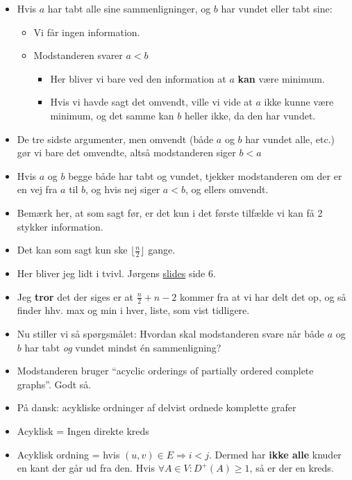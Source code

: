 \begin{frame}[allowframebreaks]
\begin{itemize}
		\item Hvis $a$ har tabt alle sine sammenligninger, og $b$ har vundet eller tabt sine:
		      \begin{itemize}
			      \item Vi får ingen information.
			      \item Modstanderen svarer $a < b$
			            \begin{itemize}
				            \item Her bliver vi bare ved den information at $a$ \textbf{kan} være minimum.
				            \item Hvis vi havde sagt det omvendt, ville vi vide at $a$ ikke kunne være minimum, og det samme kan $b$ heller ikke, da den har vundet.
			            \end{itemize}
		      \end{itemize}
		\item De tre sidste argumenter, men omvendt (både $a$ og $b$ har vundet alle, etc.) gør vi bare det omvendte, altså modstanderen siger $b < a$
		\item Hvis $a$ og $b$ begge både har tabt og vundet, tjekker modstanderen om der er en vej fra $a$ til $b$, og hvis nej siger $a < b$, og ellers omvendt.
		\item Bemærk her, at som sagt før, er det kun i det første tilfælde vi kan få 2 stykker information.
		\item Det kan som sagt kun ske $\lfloor \frac{n}{2} \rfloor$ gange.
		\item Her bliver jeg lidt i tvivl. Jørgens \href{https://imada.sdu.dk/u/jbj/DM553/Slides21/Lect22.pdf}{slides} side 6.
		\item Jeg \textbf{tror} det der siges er at $\frac{n}{2} + n-2$ kommer fra at vi har delt det op, og så finder hhv. max og min i hver, liste, som vist tidligere.
		\item Nu stiller vi så spørgsmålet: Hvordan skal modstanderen svare når både $a$ og $b$ har tabt \textit{og} vundet mindst én  sammenligning?
		\item Modstanderen bruger ``acyclic orderings of partially ordered complete graphs''. Godt så.
		\item På dansk: acykliske ordninger af delvist ordnede komplette grafer
		\item Acyklisk = Ingen direkte kreds
		\item Acyklisk ordning = hvis $(u,v) \in E \Rightarrow i < j $. Dermed har \textbf{ikke alle} knuder en kant der går ud fra den. Hvis $\forall A \in V : D^{+}(A) \ge 1$, så er der en kreds.

\end{itemize}
\end{frame}

